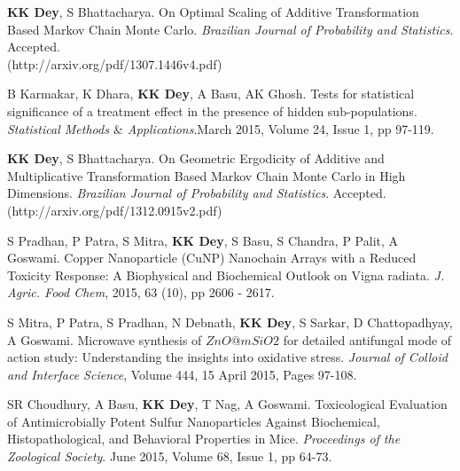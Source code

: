\documentclass[margin,line]{res}
\begin{document}
\begin{resume}
\begin{enumerate}
{\item \textbf{KK Dey}, S Bhattacharya. On Optimal Scaling of Additive Transformation Based Markov Chain Monte Carlo.  \textit{Brazilian Journal of Probability and Statistics}. Accepted.\\
(http://arxiv.org/pdf/1307.1446v4.pdf)

\item B Karmakar, K Dhara, \textbf{KK Dey}, A Basu, AK Ghosh. Tests for statistical significance of a treatment effect in the presence of hidden sub-populations. \textit{Statistical Methods $\&$ Applications}.March 2015, Volume 24, Issue 1, pp 97-119. 

\item \textbf{KK Dey}, S Bhattacharya. On Geometric Ergodicity of Additive and Multiplicative Transformation Based Markov Chain Monte Carlo in High Dimensions. \textit{Brazilian Journal of Probability and Statistics}. Accepted. \\
(http://arxiv.org/pdf/1312.0915v2.pdf)

\item S Pradhan, P Patra, S Mitra, \textbf{KK Dey}, S Basu, S Chandra, P Palit, A Goswami. Copper Nanoparticle (CuNP) Nanochain Arrays with a Reduced Toxicity Response: A Biophysical and Biochemical Outlook on Vigna radiata. \textit{J. Agric. Food Chem}, 2015, 63 (10), pp 2606 - 2617.  

\item S Mitra, P Patra, S Pradhan, N Debnath, \textbf{KK Dey}, S Sarkar, D Chattopadhyay, A Goswami. Microwave synthesis of $ZnO@mSiO2$ for detailed antifungal mode of action study: Understanding the insights into oxidative stress. \textit{Journal of Colloid and Interface Science}, Volume 444, 15 April 2015, Pages 97-108. 

\item SR Choudhury, A Basu, \textbf{KK Dey}, T Nag, A Goswami. Toxicological Evaluation of Antimicrobially Potent Sulfur Nanoparticles Against Biochemical, Histopathological, and Behavioral Properties in Mice. \textit{Proceedings of the Zoological Society}. June 2015, Volume 68, Issue 1, pp 64-73. 


}
\end{enumerate}
\end{resume}
\end{document}
